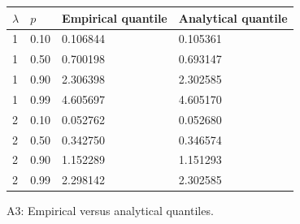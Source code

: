 \begin{center}
\small
\begin{tabular}{llll}
\toprule
$\lambda$ & $p$ & Empirical quantile & Analytical quantile\\
\midrule
1 & 0.10 & 0.106844 & 0.105361\\
1 & 0.50 & 0.700198 & 0.693147\\
1 & 0.90 & 2.306398 & 2.302585\\
1 & 0.99 & 4.605697 & 4.605170\\
2 & 0.10 & 0.052762 & 0.052680\\
2 & 0.50 & 0.342750 & 0.346574\\
2 & 0.90 & 1.152289 & 1.151293\\
2 & 0.99 & 2.298142 & 2.302585\\
\bottomrule
\end{tabular}
\par\smallskip A3: Empirical versus analytical quantiles.
\end{center}